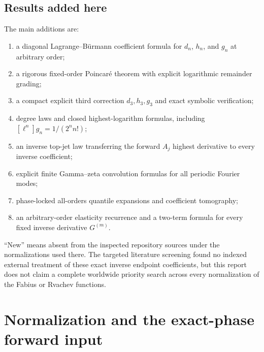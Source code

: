\documentclass[11pt,oneside]{article}
\numberwithin{equation}{section}
\theoremstyle{definition}
\theoremstyle{remark}
\begin{document}
\subsection{Results added here}
\begin{resultbox}
The main additions are:
\begin{enumerate}
\item a diagonal Lagrange--Bürmann coefficient formula for $d_n$, $h_n$, and $g_n$ at arbitrary order;
\item a rigorous fixed-order Poincaré theorem with explicit logarithmic remainder grading;
\item a compact explicit third correction $d_3,h_3,g_3$ and exact symbolic verification;
\item degree laws and closed highest-logarithm formulas, including $[\ell^n]g_n=1/(2^n n!)$;
\item an inverse top-jet law transferring the forward $A_j$ highest derivative to every inverse coefficient;
\item explicit finite Gamma--zeta convolution formulas for all periodic Fourier modes;
\item phase-locked all-orders quantile expansions and coefficient tomography;
\item an arbitrary-order elasticity recurrence and a two-term formula for every fixed inverse derivative $G^{(m)}$.
\end{enumerate}
\end{resultbox}

\begin{cautionbox}
``New'' means absent from the inspected repository sources under the normalizations used there.  The targeted literature screening found no indexed external treatment of these exact inverse endpoint coefficients, but this report does not claim a complete worldwide priority search across every normalization of the Fabius or Rvachev functions.
\end{cautionbox}

\section{Normalization and the exact-phase forward input}
\label{sec:input}
\end{document}
